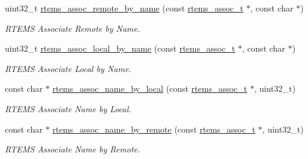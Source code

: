\begin{DoxyCompactItemize}
\mbox{\label{group__RTEMSAPIAssociativity_gaf34db995ed84624d2b06e46d65f0cb98}} 
uint32\+\_\+t \mbox{\hyperlink{group__RTEMSAPIAssociativity_gaf34db995ed84624d2b06e46d65f0cb98}{rtems\+\_\+assoc\+\_\+remote\+\_\+by\+\_\+name}} (const \mbox{\hyperlink{structrtems__assoc__t}{rtems\+\_\+assoc\+\_\+t}} $\ast$, const char $\ast$)
\begin{DoxyCompactList}\small\item\em R\+T\+E\+MS Associate Remote by Name. \end{DoxyCompactList}\item 
\mbox{\label{group__RTEMSAPIAssociativity_ga426faf0bcd0c0a964608c8f53879cf5d}} 
uint32\+\_\+t \mbox{\hyperlink{group__RTEMSAPIAssociativity_ga426faf0bcd0c0a964608c8f53879cf5d}{rtems\+\_\+assoc\+\_\+local\+\_\+by\+\_\+name}} (const \mbox{\hyperlink{structrtems__assoc__t}{rtems\+\_\+assoc\+\_\+t}} $\ast$, const char $\ast$)
\begin{DoxyCompactList}\small\item\em R\+T\+E\+MS Associate Local by Name. \end{DoxyCompactList}\item 
\mbox{\label{group__RTEMSAPIAssociativity_gaa7d58d2ac10b45c7dd2fb6f2829a1468}} 
const char $\ast$ \mbox{\hyperlink{group__RTEMSAPIAssociativity_gaa7d58d2ac10b45c7dd2fb6f2829a1468}{rtems\+\_\+assoc\+\_\+name\+\_\+by\+\_\+local}} (const \mbox{\hyperlink{structrtems__assoc__t}{rtems\+\_\+assoc\+\_\+t}} $\ast$, uint32\+\_\+t)
\begin{DoxyCompactList}\small\item\em R\+T\+E\+MS Associate Name by Local. \end{DoxyCompactList}\item 
\mbox{\label{group__RTEMSAPIAssociativity_ga64ac112275510abebf41cabf873ae62e}} 
const char $\ast$ \mbox{\hyperlink{group__RTEMSAPIAssociativity_ga64ac112275510abebf41cabf873ae62e}{rtems\+\_\+assoc\+\_\+name\+\_\+by\+\_\+remote}} (const \mbox{\hyperlink{structrtems__assoc__t}{rtems\+\_\+assoc\+\_\+t}} $\ast$, uint32\+\_\+t)
\begin{DoxyCompactList}\small\item\em R\+T\+E\+MS Associate Name by Remote. \end{DoxyCompactList}\item 

\end{DoxyCompactItemize}
